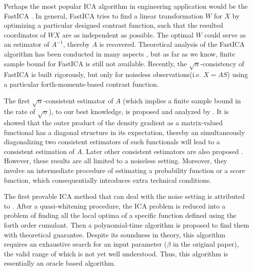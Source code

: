 \documentclass[twoside]{article}
\theoremstyle{definition}
\begin{document}
Perhaps the most popular ICA algorithm in engineering application would be the FastICA \citep{hyvarinen1999fast}. 
In general, FastICA tries to find a linear transformation $W$ for $X$ by optimizing a particular designed contrast function, 
such that the resulted coordinates of $WX$ are as independent as possible. 
The optimal $W$ could serve as an estimator of $A^{-1}$, thereby $A$ is recovered.  
Theoretical analysis of the FastICA algorithm has been conducted in many aspects \citep{tichavsky2006performance,oja2006fastica,ollila2010deflation,dermoune2013fastica,wei2014convergence}, 
but as far as we know, finite sample bound for FastICA is still not available.
Recently, the $\sqrt{n}$-consistency of FastICA is built rigorously, but only for noiseless observations(i.e. $X = AS$) using a particular forth-moments-based contrast function\citep{miettinen2014fourth}. 

The first  $\sqrt{n}$-consistent estimator of $A$ (which implies a finite sample bound in the rate of $\sqrt{n}$), to our best knowledge, is proposed and analyzed by \citet{samarov2004nonparametric}. 
It is showed that the outer product of the density gradient as a matrix-valued functional has a diagonal structure in its expectation, 
thereby an simultaneously diagonalizing two consistent estimators of such functionals will lead to a consistent estimation of $A$.
Later other consistent estimators are also proposed \citep{eriksson2003characteristic,chen2005consistent,chen2006efficient}.
However, these results are all limited to a noiseless setting. 
Moreover, they involve an intermediate procedure of estimating a probability function or a score function, which consequentially introduces extra technical conditions. 

The first provable ICA method that can deal with the noise setting is attributed to \citet{arora2012provable}. 
After a quasi-whitening procedure, the ICA problem is reduced into a problem of finding all the local optima of a specific function defined using the forth order cumulant. 
Then a polynomial-time algorithm is proposed to find them with theoretical guarantee.
Despite its soundness in theory, this algorithm requires an exhaustive search for an input parameter ($\beta$ in the original paper), the valid range of which is not yet well understood. Thus, this algorithm is essentially an oracle based algorithm.
\end{document}
